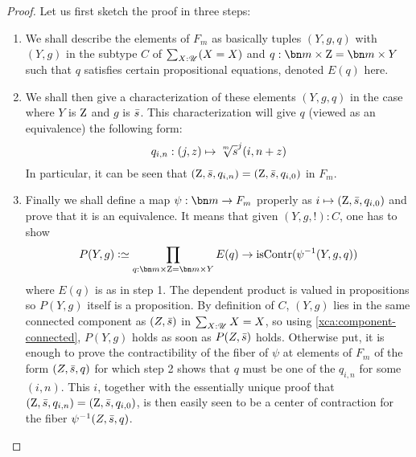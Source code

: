 \begin{proof}
  Let us first sketch the proof in three steps:
  \begin{enumerate}[label={\sc Step \arabic*}.]
  \item We shall describe the elements of $F_m$ as basically tuples
    $(Y,g,q)$ with $(Y,g)$ in the subtype $C$ of $\sum_{X:{\mathscr{U}}}(X=X)$
    and $q:\bn m\times \zet = \bn m\times Y$ such that $q$ satisfies
    certain propositional equations, denoted $E(q)$ here.
  \item We shall then give a characterization of these elements
    $(Y,g,q)$ in the case where $Y$ is $\mathrm{Z}$ and $g$ is $\bar {s}$. This characterization will give $q$ (viewed as an equivalence)
    the following form:
    \begin{displaymath}
      q_{i,n}: (j,z) \mapsto {\sqrt[\uproot{2}m]s}^j(i,n+z)
    \end{displaymath}
    In particular, it can be seen that
    $(\mathrm{Z},\bar {s},q_{i,n}) = (\mathrm{Z},\bar {s},q_{i,0})$ in $F_m$.
  \item Finally we shall define a map $\psi: \bn m \to F_m$ properly
    as $i\mapsto (\mathrm{Z},\bar {s},q_{i,0})$ and prove that it is an
    equivalence. It means that given $(Y,g,!):C$, one has to show
    \begin{displaymath}
      P(Y,g) \defequi \prod_{q:\bn m \times \zet = \bn m \times Y}E(q)\to\iscontr(\inv{\psi}(Y,g,q))
    \end{displaymath}
    where $E(q)$ is as in step 1. The dependent product is valued in
    propositions so $P(Y,g)$ itself is a proposition. By definition of
    $C$, $(Y,g)$ lies in the same connected component as $(Z,\bar {s})$
    in $\sum_{X:{\mathscr{U}}}X=X$, so using \cref{xca:component-connected},
    $P(Y,g)$ holds as soon as $P(Z,\bar {s})$ holds. Otherwise put, it
    is enough to prove the contractibility of the fiber of $\psi$ at
    elements of $F_m$ of the form $(Z,\bar {s},q)$ for which step 2
    shows that $q$ must be one of the $q_{i,n}$ for some $(i,n)$. This
    $i$, together with the essentially unique proof that
    $(\mathrm{Z},\bar {s}, q_{i,n}) = (\mathrm{Z},\bar {s}, q_{i,0})$, is then
    easily seen to be a center of contraction for the fiber
    $\psi^{-1}(Z,\bar {s}, q)$.
  \end{enumerate}


\end{proof}
